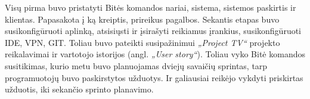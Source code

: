 \smallskip
Visų pirma buvo pristatyti Bitės komandos nariai, sistema, sistemos paskirtis ir klientas. Papasakota į ką kreiptis, prireikus pagalbos. Sekantis etapas buvo
susikonfigūruoti aplinką, atsisiųsti ir įsirašyti reikiamus įrankius, susikonfigūruoti IDE, VPN, GIT. Toliau buvo pateikti susipažinimui \textit{„Project TV“} projekto reikalavimai ir
vartotojo istorijos (angl. \textit{„User story“}). Toliau vyko Bitė komandos susitikimas, kurio metu buvo planuojamas dviejų savaičių sprintas, tarp programuotojų buvo paskirstytos
užduotys. Ir galiausiai reikėjo vykdyti priskirtas užduotis, iki sekančio sprinto planavimo.